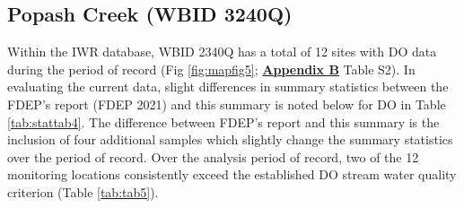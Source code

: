 \documentclass[]{interact}
\theoremstyle{plain}%
\theoremstyle{definition}
\theoremstyle{remark}
\begin{document}
\hypertarget{popash-creek-wbid-3240q}{%
\subsection{Popash Creek (WBID 3240Q)}\label{popash-creek-wbid-3240q}}

Within the IWR database, WBID 2340Q has a total of 12 sites with DO data
during the period of record (Fig \ref{fig:mapfig5};
\textbf{\protect\hyperlink{appendix-b}{Appendix B}} Table S2). In
evaluating the current data, slight differences in summary statistics
between the FDEP's report (FDEP 2021) and this summary is noted below
for DO in Table \ref{tab:stattab4}. The difference between FDEP's report
and this summary is the inclusion of four additional samples which
slightly change the summary statistics over the period of record. Over
the analysis period of record, two of the 12 monitoring locations
consistently exceed the established DO stream water quality criterion
(Table \ref{tab:tab5}).

\begin{table}[H]

\caption{\label{tab:table2}\label{tab:stattab4} Summary statisic of dissolved oxygen (DO) saturation for Popash Creek (WBID 3240Q) during the period of record (Calendar Year: 2006 - 2020) as reported by FDEP (2021) and summaried data (this report)}
\centering
{}
\end{table}
\end{document}
